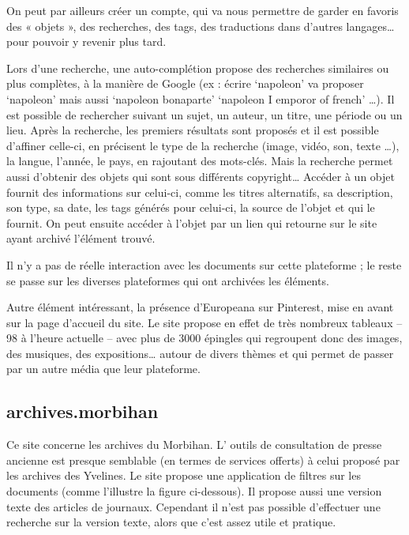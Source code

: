        On peut par ailleurs créer un compte, qui va nous permettre de garder en favoris des « objets », des recherches, des tags,
        des traductions dans d’autres langages… pour pouvoir y revenir plus tard.

        Lors d’une recherche, une auto-complétion propose des recherches similaires ou plus complètes, à la manière de Google
        (ex : écrire ‘napoleon’ va proposer ‘napoleon’ mais aussi ‘napoleon bonaparte’ ‘napoleon I emporor of french’ …).
        Il est possible de rechercher suivant un sujet, un auteur, un titre, une période ou un lieu. Après la recherche,
        les premiers résultats sont proposés et il est possible d’affiner celle-ci, en précisent le type de la recherche
        (image, vidéo, son, texte …), la langue, l'année, le pays, en rajoutant des mots-clés. Mais la recherche permet aussi
        d’obtenir des objets qui sont sous différents copyright… 
				Accéder à un objet fournit des informations sur celui-ci, comme les titres alternatifs, sa description, son type, sa date, les tags générés pour celui-ci,
        la source de l’objet et qui le fournit. On peut ensuite accéder à l’objet par un lien qui retourne sur le site ayant archivé l’élément trouvé.

        Il n’y a pas de réelle interaction avec les documents sur cette plateforme ; le reste se passe sur les diverses plateformes qui ont archivées les éléments.

        Autre élément intéressant, la présence d’Europeana sur Pinterest, mise en avant sur la page d’accueil du site.
        Le site propose en effet de très nombreux tableaux – 98 à l’heure actuelle – avec plus de 3000 épingles qui regroupent
        donc des images, des musiques, des expositions… autour de divers thèmes et qui permet de passer par un autre média que leur plateforme.


        \subsection{archives.morbihan}
        \label{subsec:morbihan}
        Ce site concerne les archives du Morbihan. L’ outils de consultation de presse ancienne est presque semblable
        (en termes de services offerts) à celui proposé par les archives des Yvelines. Le site propose une application
        de filtres sur les documents (comme l’illustre la figure ci-dessous). Il propose aussi une version texte des
        articles de journaux. Cependant il n’est pas possible d’effectuer une recherche sur la version texte,
        alors que c'est assez utile et pratique.

